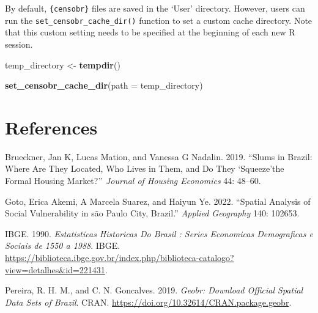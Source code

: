 \documentclass[
]{article}
\newenvironment{Shaded}{\begin{snugshade}}{\end{snugshade}}
\newcommand{\AttributeTok}[1]{\textcolor[rgb]{0.13,0.29,0.53}{#1}}
\newcommand{\FunctionTok}[1]{\textcolor[rgb]{0.13,0.29,0.53}{\textbf{#1}}}
\newcommand{\NormalTok}[1]{#1}
\newcommand{\OtherTok}[1]{\textcolor[rgb]{0.56,0.35,0.01}{#1}}
\newlength{\cslhangindent}
\newenvironment{CSLReferences}[2] %
 {\begin{list}{}{%
  \setlength{\itemindent}{0pt}
  \setlength{\leftmargin}{0pt}
  \setlength{\parsep}{0pt}
  \ifodd #1
   \setlength{\leftmargin}{\cslhangindent}
   \setlength{\itemindent}{-1\cslhangindent}
  \fi
  \setlength{\itemsep}{#2\baselineskip}}}
 {\end{list}}
\begin{document}
By default, \texttt{\{censobr\}} files are saved in the `User'
directory. However, users can run the
\texttt{set\_censobr\_cache\_dir()} function to set a custom cache
directory. Note that this custom setting needs to be specified at the
beginning of each new R session.

\begin{Shaded}
\begin{Highlighting}[]
\NormalTok{temp\_directory }\OtherTok{\textless{}{-}} \FunctionTok{tempdir}\NormalTok{()}

\FunctionTok{set\_censobr\_cache\_dir}\NormalTok{(}\AttributeTok{path =}\NormalTok{ temp\_directory)}
\end{Highlighting}
\end{Shaded}

\section*{References}\label{references}

\label{refs}
\begin{CSLReferences}{1}{0}
Brueckner, Jan K, Lucas Mation, and Vanessa G Nadalin. 2019. {``Slums in
Brazil: Where Are They Located, Who Lives in Them, and Do They
`Squeeze'the Formal Housing Market?''} \emph{Journal of Housing
Economics} 44: 48--60.

Goto, Erica Akemi, A Marcela Suarez, and Haiyun Ye. 2022. {``Spatial
Analysis of Social Vulnerability in s{ã}o Paulo City, Brazil.''}
\emph{Applied Geography} 140: 102653.

IBGE. 1990. \emph{Estatisticas Historicas Do Brasil : Series Economicas
Demograficas e Sociais de 1550 a 1988}. IBGE.
\url{https://biblioteca.ibge.gov.br/index.php/biblioteca-catalogo?view=detalhes&id=221431}.

Pereira, R. H. M., and C. N. Goncalves. 2019. \emph{Geobr: Download
Official Spatial Data Sets of Brazil}. CRAN.
\url{https://doi.org/10.32614/CRAN.package.geobr}.

\end{CSLReferences}
\end{document}
